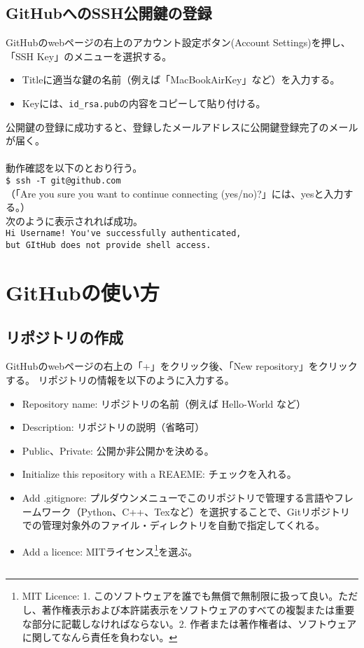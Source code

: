 \documentclass[11pt, oneside]{article}   	%
\begin{document}
\subsection{GitHubへのSSH公開鍵の登録}
GitHubのwebページの右上のアカウント設定ボタン(Account Settings)を押し、「SSH Key」のメニューを選択する。
\begin {itemize}
\item Titleに適当な鍵の名前（例えば「MacBookAirKey」など）を入力する。
\item Keyには、\verb|id_rsa.pub|の内容をコピーして貼り付ける。
\end{itemize}
公開鍵の登録に成功すると、登録したメールアドレスに公開鍵登録完了のメールが届く。\\ \\
動作確認を以下のとおり行う。\\ 
\verb|$ ssh -T git@github.com|\\
（「Are you sure you want to continue connecting (yes/no)?」には、yesと入力する。）\\
次のように表示されれば成功。\\
\verb|Hi Username! You've successfully authenticated, |\\
\verb|but GItHub does not provide shell access.|\\


\section{GitHubの使い方}
\subsection{リポジトリの作成}
GitHubのwebページの右上の「+」をクリック後、「New repository」をクリックする。
リポジトリの情報を以下のように入力する。
\begin{itemize}
\item Repository name: リポジトリの名前（例えば Hello-World など）
\item Description: リポジトリの説明（省略可）
\item Public、Private: 公開か非公開かを決める。
\item Initialize this repository with a REAEME: チェックを入れる。
\item Add .gitignore: プルダウンメニューでこのリポジトリで管理する言語やフレームワーク（Python、C++、Texなど）を選択することで、Gitリポジトリでの管理対象外のファイル・ディレクトリを自動で指定してくれる。
\item Add a licence: MITライセンス\footnote{MIT Licence: 1. このソフトウェアを誰でも無償で無制限に扱って良い。ただし、著作権表示および本許諾表示をソフトウェアのすべての複製または重要な部分に記載しなければならない。2. 作者または著作権者は、ソフトウェアに関してなんら責任を負わない。}を選ぶ。
\end{itemize}

\subsection{}
\end{document}
